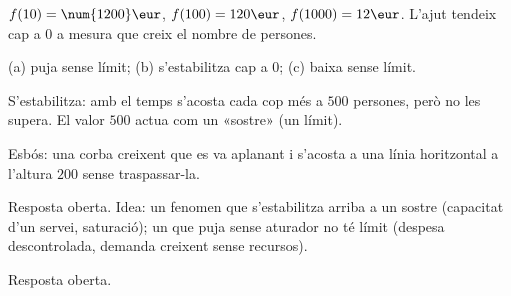 \begin{solucions}
\begin{sollist}
  \item $f(10)=\num{1200}\eur$, $f(100)=120\eur$, $f(1000)=12\eur$. L'ajut tendeix cap
        a $0$ a mesura que creix el nombre de persones.
  \item (a) puja sense límit; \quad (b) s'estabilitza cap a $0$; \quad
        (c) baixa sense límit.
  \item S'estabilitza: amb el temps s'acosta cada cop més a $500$ persones, però no les
        supera. El valor $500$ actua com un «sostre» (un límit).
  \item Esbós: una corba creixent que es va aplanant i s'acosta a una línia horitzontal
        a l'altura $200$ sense traspassar-la.
  \item Resposta oberta. Idea: un fenomen que s'estabilitza arriba a un sostre
        (capacitat d'un servei, saturació); un que puja sense aturador no té límit
        (despesa descontrolada, demanda creixent sense recursos).
  \item Resposta oberta.
\end{sollist}
\end{solucions}
